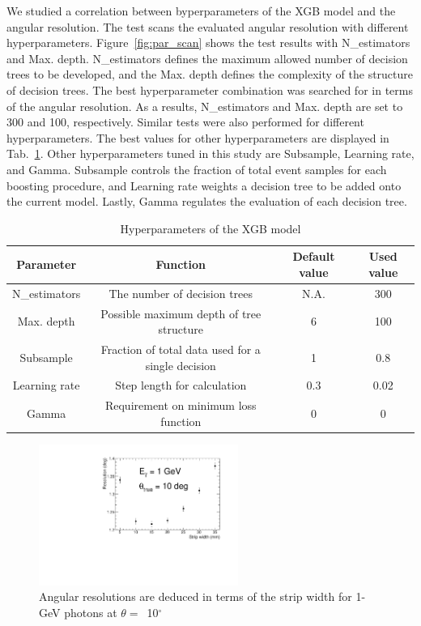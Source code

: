 \documentclass[preprint,12pt,times,a4paper]{elsarticle}
\begin{document}
We studied a correlation between byperparameters of the XGB model and the angular resolution. The test scans the evaluated angular resolution with different hyperparameters. Figure~\ref{fig:par_scan} shows the test results with N\_estimators and Max. depth. N\_estimators defines the maximum allowed number of decision trees to be developed, and the Max. depth defines the complexity of the structure of decision trees. The best hyperparameter combination was searched for in terms of the angular resolution. As a results, N\_estimators and Max. depth are set to 300 and 100, respectively. Similar tests were also performed for different hyperparameters. The best values for other hyperparameters are displayed in Tab.~\ref{tab:XgbPar}. Other hyperparameters tuned in this study are Subsample, Learning rate, and Gamma. Subsample controls the fraction of total event samples for each boosting procedure, and Learning rate weights a decision tree to be added onto the current model. Lastly, Gamma regulates the evaluation of each decision tree.

\begin{table}[hbt!]{\small
\centering
\caption{Hyperparameters of the XGB model}
\begin{tabular}{cccc}
\hline 
Parameter & Function & Default value & Used value \\ \hline 
N\_estimators & The number of decision trees & N.A. & 300 \\  
Max. depth & Possible maximum depth of tree structure & 6 & 100 \\ 
Subsample & Fraction of total data used for a single decision & 1 & 0.8 \\ 
Learning rate & Step length for calculation & 0.3 & 0.02 \\ 
Gamma & Requirement on minimum loss function & 0 & 0 \\ 
\hline
\end{tabular}
\label{tab:XgbPar}
}\end{table}

\begin{figure}[!hbt]
\centering
\includegraphics[width=0.58\textwidth]{figures/Fig5_width.pdf}
\caption{ Angular resolutions are deduced in terms of the strip width for 1-GeV photons at $\theta=$~10$^{\circ}$ }
\label{fig:angle_reco_width}
\end{figure}
\end{document}
